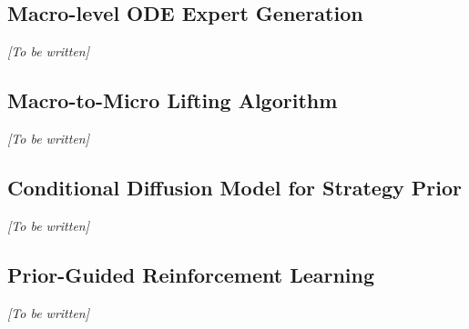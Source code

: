 \subsection{Macro-level ODE Expert Generation}
\label{sec:ode_expert}

\textit{[To be written]}

\subsection{Macro-to-Micro Lifting Algorithm}
\label{sec:lifting}

\textit{[To be written]}

\subsection{Conditional Diffusion Model for Strategy Prior}
\label{sec:diffusion}

\textit{[To be written]}

\subsection{Prior-Guided Reinforcement Learning}
\label{sec:rl}

\textit{[To be written]}
